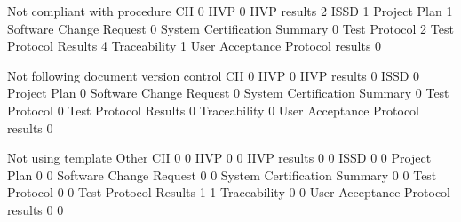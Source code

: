 \documentclass{article}
\begin{document}
\begin{Schunk}
\begin{Soutput}
                                   Not compliant with procedure
  CII                                                         0
  IIVP                                                        0
  IIVP results                                                2
  ISSD                                                        1
  Project Plan                                                1
  Software Change Request                                     0
  System Certification Summary                                0
  Test Protocol                                               2
  Test Protocol Results                                       4
  Traceability                                                1
  User Acceptance Protocol results                            0
                                  
                                   Not following document version control
  CII                                                                   0
  IIVP                                                                  0
  IIVP results                                                          0
  ISSD                                                                  0
  Project Plan                                                          0
  Software Change Request                                               0
  System Certification Summary                                          0
  Test Protocol                                                         0
  Test Protocol Results                                                 0
  Traceability                                                          0
  User Acceptance Protocol results                                      0
                                  
                                   Not using template Other
  CII                                               0     0
  IIVP                                              0     0
  IIVP results                                      0     0
  ISSD                                              0     0
  Project Plan                                      0     0
  Software Change Request                           0     0
  System Certification Summary                      0     0
  Test Protocol                                     0     0
  Test Protocol Results                             1     1
  Traceability                                      0     0
  User Acceptance Protocol results                  0     0
                                  

\end{Soutput}
\end{Schunk}
\end{document}
